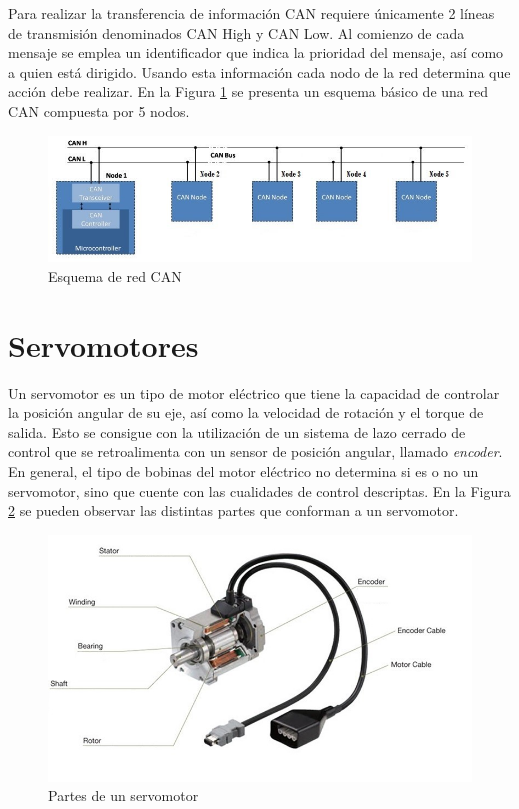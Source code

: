 Para realizar la transferencia de información CAN requiere únicamente 2 líneas de transmisión denominados CAN High y CAN Low. Al comienzo de cada mensaje se emplea un identificador que indica la prioridad del mensaje, así como a quien está dirigido. Usando esta información cada nodo de la red determina que acción debe realizar. En la Figura \ref{fig:canBus} se presenta un esquema básico de una red CAN compuesta por 5 nodos.


\begin{figure}[htbp]
	\centering
	\includegraphics[scale=.6]{./Figures/CANBUS-Esquema.jpg}
	\caption{Esquema de red CAN\protect\footnotemark}
	\label{fig:canBus}
\end{figure}


\section{Servomotores}

Un servomotor\citep{Industrial_Automation_Hands_On} es un tipo de motor eléctrico que tiene la capacidad de controlar la posición angular de su eje, así como la velocidad de rotación y el torque de salida. Esto se consigue con la utilización de un sistema de lazo cerrado de control que se retroalimenta con un sensor de posición angular, llamado \textit{encoder}. En general, el tipo de bobinas del motor eléctrico no determina si es o no un servomotor, sino que cuente con las cualidades de control descriptas. En la Figura \ref{fig:servomotor} se pueden observar las distintas partes que conforman a un servomotor.

\begin{figure}[htbp]
	\centering
	\includegraphics[scale=0.7]{./Figures/servomotor.jpg}
	\caption{Partes de un servomotor\protect\footnotemark}
	\label{fig:servomotor}
\end{figure}

